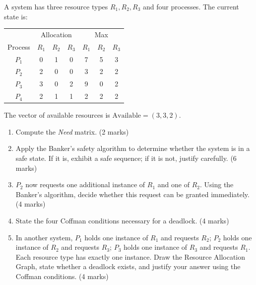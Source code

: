 \documentclass[11pt]{article}
\begin{document}
\begin{exercice}
A system has three resource types $R_1, R_2, R_3$ and four processes. The current state is:
\begin{center}
\begin{tabular}{|c|ccc|ccc|}
\hline
\rowcolor{popblueL} & \multicolumn{3}{c|}{Allocation} & \multicolumn{3}{c|}{Max} \\
\rowcolor{popblueL} Process & $R_1$ & $R_2$ & $R_3$ & $R_1$ & $R_2$ & $R_3$ \\
\hline
$P_1$ & 0 & 1 & 0 & 7 & 5 & 3 \\
\hline
$P_2$ & 2 & 0 & 0 & 3 & 2 & 2 \\
\hline
$P_3$ & 3 & 0 & 2 & 9 & 0 & 2 \\
\hline
$P_4$ & 2 & 1 & 1 & 2 & 2 & 2 \\
\hline
\end{tabular}
\end{center}
The vector of available resources is $\text{Available} = (3, 3, 2)$.
\begin{enumerate}
\item Compute the \emph{Need} matrix. \hfill (2 marks)
\item Apply the Banker's safety algorithm to determine whether the system is in a safe state. If it is, exhibit a safe sequence; if it is not, justify carefully. \hfill (6 marks)
\item $P_2$ now requests one additional instance of $R_1$ and one of $R_2$. Using the Banker's algorithm, decide whether this request can be granted immediately. \hfill (4 marks)
\item State the four Coffman conditions necessary for a deadlock. \hfill (4 marks)
\item In another system, $P_1$ holds one instance of $R_1$ and requests $R_2$; $P_2$ holds one instance of $R_2$ and requests $R_3$; $P_3$ holds one instance of $R_3$ and requests $R_1$. Each resource type has exactly one instance. Draw the Resource Allocation Graph, state whether a deadlock exists, and justify your answer using the Coffman conditions. \hfill (4 marks)
\end{enumerate}
\end{exercice}
\end{document}
